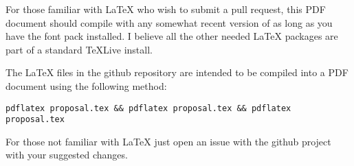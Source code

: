 For those familiar with \LaTeX{} who wish to submit a pull request, this PDF document should compile with any somewhat recent version of  as long as you have the  font pack installed. I believe all the other needed \LaTeX{} packages are part of a standard \TeX{}Live install.

The \LaTeX{} files in the github repository are intended to be compiled into a PDF document using the following method:

\begin{verbatim}
pdflatex proposal.tex && pdflatex proposal.tex && pdflatex proposal.tex
\end{verbatim}

For those not familiar with \LaTeX{} just open an issue with the github project with your suggested changes.

